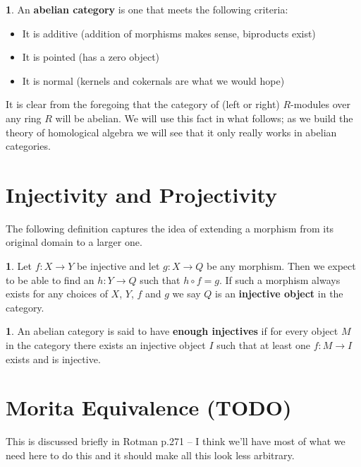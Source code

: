 \documentclass[oneside,english]{amsbook}
\numberwithin{section}{chapter}
\theoremstyle{plain}
\theoremstyle{definition}
\newtheorem{defn}[thm]{\protect\definitionname}
\providecommand{\definitionname}{Definition}
\begin{document}
			\begin{defn}
				An \textbf{abelian category} is one that meets the following criteria:
				\begin{itemize}
					\item It is additive (addition of morphisms makes sense, biproducts exist)
					\item It is pointed (has a zero object)
					\item It is normal (kernels and cokernals are what we would hope)
				\end{itemize}
					
			\end{defn}
			
			It is clear from the foregoing that the category of (left or right) $R$-modules over any ring $R$ will be abelian. We will use this fact in what follows; as we build the theory of homological algebra we will see that it only really works in abelian categories.
			
		\section{Injectivity and Projectivity}
		
			The following definition captures the idea of extending a morphism from its original domain to a larger one. 
					
			\begin{defn}
				Let $f:X\to Y$ be injective and let $g:X\to Q$ be any morphism. Then we expect to be able to find an $h:Y\to Q$ such that $h\circ f = g$. If such a morphism always exists for any choices of $X$, $Y$, $f$ and $g$ we say $Q$ is an \textbf{injective object} in the category. 
			\end{defn}
			
			\begin{defn}
				An abelian category is said to have \textbf{enough injectives} if for every object $M$ in the category there exists an injective object $I$ such that at least one $f:M\to I$ exists and is injective.
			\end{defn}
			
	
		\section{Morita Equivalence (TODO)}
		
			This is discussed briefly in Rotman p.271 -- I think we'll have most of what we need here to do this and it should make all this look less arbitrary.
		
\end{document}
